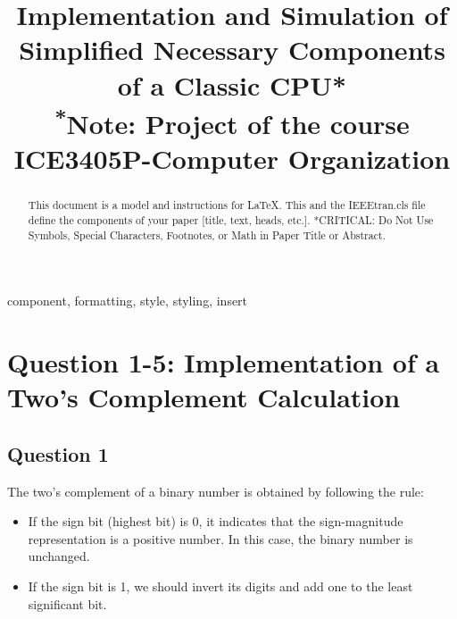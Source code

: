 \documentclass[conference]{IEEEtran}
\begin{document}
\title{Implementation and Simulation of Simplified Necessary Components of a Classic CPU*\\
{\footnotesize \textsuperscript{*}Note: Project of the course ICE3405P-Computer Organization}
}

\author{
\and
{}
}

\maketitle

\begin{abstract}
This document is a model and instructions for \LaTeX.
This and the IEEEtran.cls file define the components of your paper [title, text, heads, etc.]. *CRITICAL: Do Not Use Symbols, Special Characters, Footnotes, 
or Math in Paper Title or Abstract.
\end{abstract}

\begin{IEEEkeywords}
component, formatting, style, styling, insert
\end{IEEEkeywords}


\section{Question 1-5: Implementation of a Two's Complement Calculation}

\subsection{Question 1}\label{sec:q_A}

The two's complement of a binary number is obtained by following the rule:
\begin{itemize}
    \item If the sign bit (highest bit) is 0, it indicates that the sign-magnitude representation is a positive number. In this case, the binary number is unchanged.
    \item If the sign bit is 1, we should invert its digits and add one to the least significant bit. 
\end{itemize}
\end{document}

